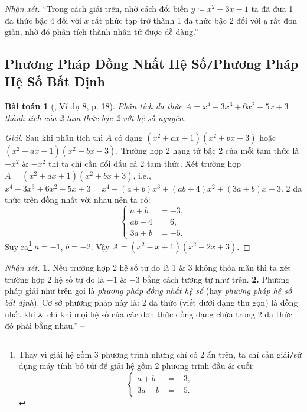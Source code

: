 \documentclass{article}
\numberwithin{equation}{section}
\newtheorem{baitoan}{Bài toán}
\begin{document}
\noindent\textit{Nhận xét.} ``Trong cách giải trên, nhờ cách đổi biến $y\coloneqq x^2 - 3x - 1$ ta đã đưa 1 đa thức bậc 4 đối với $x$ rất phức tạp trở thành 1 đa thức bậc 2 đối với $y$ rất đơn giản, nhờ đó phân tích thành nhân tử được dễ dàng.'' -- \cite[p. 19]{Tuyen_Toan_8}

\subsection{Phương Pháp Đồng Nhất Hệ Số\texttt{/}Phương Pháp Hệ Số Bất Định}

\begin{baitoan}[\cite{Tuyen_Toan_8}, Ví dụ 8, p. 18]
	Phân tích đa thức $A = x^4 - 3x^3 + 6x^2 - 5x + 3$ thành tích của 2 tam thức bậc 2 với hệ số nguyên.
\end{baitoan}

\begin{proof}[Giải]
	Sau khi phân tích thì $A$ có dạng $(x^2 + ax + 1)(x^2 + bx + 3)$ hoặc $(x^2 + ax - 1)(x^2 + bx - 3)$. Trường hợp 2 hạng tử bậc 2 của mỗi tam thức là $-x^2$ \& $-x^2$ thì ta chỉ cần đổi dấu cả 2 tam thức. Xét trường hợp  $A = (x^2 + ax + 1)(x^2 + bx + 3)$, i.e., $x^4 - 3x^3 + 6x^2 - 5x + 3 = x^4 + (a + b)x^3 + (ab + 4)x^2 + (3a + b)x + 3$. 2 đa thức trên đồng nhất với nhau nên ta có:
	\begin{equation*}
		\left\{\begin{split}
			a + b &= -3,\\
			ab + 4 &= 6,\\
			3a + b &= -5.
		\end{split}\right.
	\end{equation*}
	Suy ra\footnote{Thay vì giải hệ gồm 3 phương trình nhưng chỉ có 2 ẩn trên, ta chỉ cần giải\texttt{/}sử dụng máy tính bỏ túi để giải hệ gồm 2 phương trình đầu \& cuối:
	\begin{equation*}
		\left\{\begin{split}
			a + b &= -3,\\
			3a + b &= -5.
		\end{split}\right.
	\end{equation*}} $a = -1$, $b = -2$. Vậy $A = (x^2 - x + 1)(x^2 - 2x + 3)$.
\end{proof}
\noindent\textit{Nhận xét.} \textbf{1.} Nếu trường hợp 2 hệ số tự do là 1 \& 3 không thỏa mãn thì ta xét trường hợp 2 hệ số tự do là $-1$ \& $-3$ bằng cách tương tự như trên. \textbf{2.} Phương pháp giải như trên gọi là \textit{phương pháp đồng nhất hệ số} (hay \textit{phương pháp hệ số bất định}). Cơ sở phương pháp này là: 2 đa thức (viết dưới dạng thu gọn) là đồng nhất khi \& chỉ khi mọi hệ số của các đơn thức đồng dạng chứa trong 2 đa thức đó phải bằng nhau.'' -- \cite[p. 20]{Tuyen_Toan_8}
\end{document}
